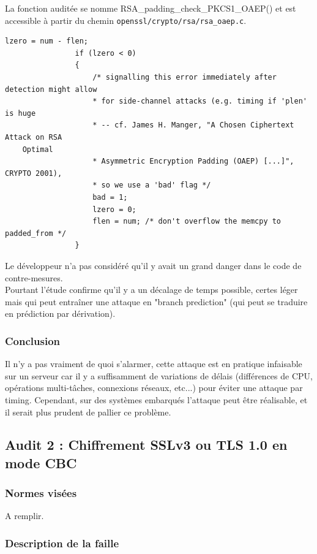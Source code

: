 			La fonction auditée se nomme RSA\_padding\_check\_PKCS1\_OAEP() et est accessible à partir du chemin \texttt{openssl/crypto/rsa/rsa\_oaep.c}.
		
		
			\begin{lstlisting}[style=customc,caption=rsa\_oaep.c,
			label=rsaoaep]
				lzero = num - flen;
				if (lzero < 0)
				{
					/* signalling this error immediately after detection might allow
					* for side-channel attacks (e.g. timing if 'plen' is huge
					* -- cf. James H. Manger, "A Chosen Ciphertext Attack on RSA
	Optimal
					* Asymmetric Encryption Padding (OAEP) [...]", CRYPTO 2001),
					* so we use a 'bad' flag */
					bad = 1;
					lzero = 0;
					flen = num; /* don't overflow the memcpy to padded_from */
				}
			\end{lstlisting}
		
			Le développeur n'a pas considéré qu'il y avait un grand danger dans le code de contre-mesures.\\
			Pourtant l'étude confirme qu'il y a un décalage de temps possible, certes léger mais qui peut entraîner une attaque en "branch prediction" (qui peut se traduire en prédiction par dérivation).\\
			
		\subsubsection{Conclusion}
		
			Il n'y a pas vraiment de quoi s'alarmer, cette attaque est en pratique infaisable sur un serveur car il y a suffisamment de variations de délais (différences de CPU, opérations multi-tâches, connexions réseaux, etc...) pour éviter une attaque par timing. Cependant, sur des systèmes embarqués l'attaque peut être réalisable, et il serait plus prudent de pallier ce problème.
			
	\subsection{Audit 2 : Chiffrement SSLv3 ou TLS 1.0 en mode CBC}
		\subsubsection{Normes visées}
	
			A remplir.	
	
		\subsubsection{Description de la faille}
			
